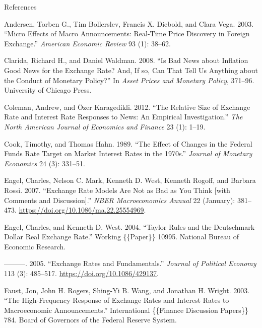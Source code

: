 \documentclass[
  ignorenonframetext,
  aspectratio=141,
]{beamer}
\newlength{\cslhangindent}
\newenvironment{CSLReferences}[2] %
 {\begin{list}{}{%
  \setlength{\itemindent}{0pt}
  \setlength{\leftmargin}{0pt}
  \setlength{\parsep}{0pt}
  \ifodd #1
   \setlength{\leftmargin}{\cslhangindent}
   \setlength{\itemindent}{-1\cslhangindent}
  \fi
  \setlength{\itemsep}{#2\baselineskip}}}
 {\end{list}}
\begin{document}
\begin{frame}[allowframebreaks]{References}
\small

\label{refs}
\begin{CSLReferences}{1}{0}
Andersen, Torben G., Tim Bollerslev, Francis X. Diebold, and Clara Vega.
2003. {``Micro {Effects} of {Macro Announcements}: {Real-Time Price
Discovery} in {Foreign Exchange}.''} \emph{American Economic Review} 93
(1): 38--62.

Clarida, Richard H., and Daniel Waldman. 2008. {``Is Bad News about
Inflation Good News for the Exchange Rate? {And}, If so, Can That Tell
Us Anything about the Conduct of Monetary Policy?''} In \emph{Asset
Prices and Monetary Policy}, 371--96. University of Chicago Press.

Coleman, Andrew, and Özer Karagedikli. 2012. {``The Relative Size of
Exchange Rate and Interest Rate Responses to News: {An} Empirical
Investigation.''} \emph{The North American Journal of Economics and
Finance} 23 (1): 1--19.

Cook, Timothy, and Thomas Hahn. 1989. {``The Effect of Changes in the
Federal Funds Rate Target on Market Interest Rates in the 1970s.''}
\emph{Journal of Monetary Economics} 24 (3): 331--51.

Engel, Charles, Nelson C. Mark, Kenneth D. West, Kenneth Rogoff, and
Barbara Rossi. 2007. {``Exchange {Rate Models Are Not} as {Bad} as {You
Think} {[}with {Comments} and {Discussion}{]}.''} \emph{NBER
Macroeconomics Annual} 22 (January): 381--473.
\url{https://doi.org/10.1086/ma.22.25554969}.

Engel, Charles, and Kenneth D. West. 2004. {``Taylor {Rules} and the
{Deutschmark-Dollar Real Exchange Rate}.''} Working \{\{Paper\}\} 10995.
National Bureau of Economic Research.

---------. 2005. {``Exchange {Rates} and {Fundamentals}.''}
\emph{Journal of Political Economy} 113 (3): 485--517.
\url{https://doi.org/10.1086/429137}.

Faust, Jon, John H. Rogers, Shing-Yi B. Wang, and Jonathan H. Wright.
2003. {``The {High-Frequency Response} of {Exchange Rates} and {Interest
Rates} to {Macroeconomic Announcements}.''} International \{\{Finance
Discussion Papers\}\} 784. Board of Governors of the Federal Reserve
System.


\end{CSLReferences}
\end{frame}
\end{document}
